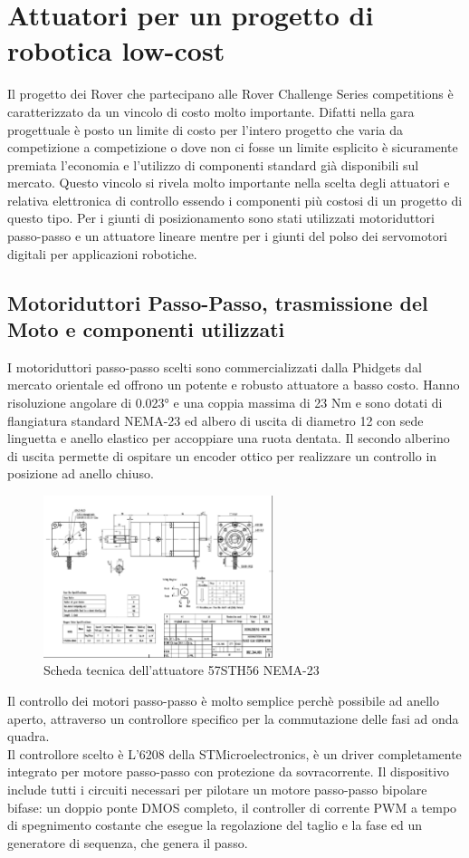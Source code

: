 \documentclass[%
corpo=11pt,
twoside,
 stile=classica,
oldstyle,
greek,%
]{toptesi}
\begin{document}
\chapter{Attuatori per un progetto di robotica low-cost} 
Il progetto dei Rover che partecipano alle Rover Challenge Series competitions è caratterizzato da un vincolo di costo molto importante. Difatti nella gara progettuale è posto un limite di costo per l'intero progetto che varia da competizione a competizione o dove non ci fosse un limite esplicito è sicuramente premiata l'economia e l'utilizzo di componenti standard già disponibili sul mercato. Questo vincolo si rivela molto importante nella scelta degli attuatori e relativa elettronica di controllo essendo i componenti più costosi di un progetto di questo tipo. 
Per i giunti di posizionamento sono stati utilizzati motoriduttori passo-passo e un attuatore lineare mentre per i giunti del polso dei servomotori digitali per applicazioni robotiche. 
	\section{Motoriduttori Passo-Passo, trasmissione del Moto e componenti utilizzati}
	I motoriduttori passo-passo scelti sono commercializzati dalla Phidgets dal mercato orientale ed offrono un potente e robusto attuatore a basso costo. Hanno risoluzione angolare di 0.023° e una coppia massima di 23 Nm e sono dotati di flangiatura standard NEMA-23 ed albero di uscita di diametro 12 con sede linguetta e anello elastico per accoppiare una ruota dentata. 
	Il secondo alberino di uscita permette di ospitare un encoder ottico per realizzare un controllo in posizione ad anello chiuso.\\
		\begin{figure}
		\centering
		\includegraphics[width=0.6\textwidth]{Screen/STEPPER.png}
		\caption{Scheda tecnica dell'attuatore 57STH56 NEMA-23}
		\label{fig:Stepper}
	\end{figure}
	Il controllo dei motori passo-passo è molto semplice perchè possibile ad anello aperto, attraverso un controllore specifico per la commutazione delle fasi ad onda quadra. \\
	Il controllore scelto è L'6208 della STMicroelectronics, è un driver completamente integrato per motore passo-passo con protezione da sovracorrente. Il dispositivo include tutti i circuiti necessari per pilotare un motore passo-passo bipolare bifase: un doppio ponte DMOS completo, il controller di corrente PWM a tempo di spegnimento costante che esegue la regolazione del taglio e la fase ed un generatore di sequenza, che genera il passo. \\
	
\end{document}
